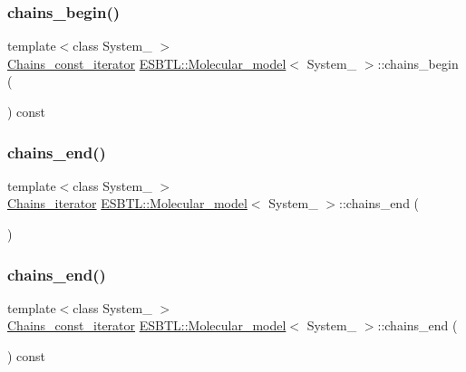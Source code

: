 \subsubsection{\texorpdfstring{chains\+\_\+begin()}{chains\_begin()}\hspace{0.1cm}{\footnotesize\ttfamily [2/2]}}
{\footnotesize\ttfamily template$<$class System\+\_\+ $>$ \\
\hyperlink{group__grp__iters_ga32c6b305275f21f3b184688be9d38ffd}{Chains\+\_\+const\+\_\+iterator} \hyperlink{classESBTL_1_1Molecular__model}{E\+S\+B\+T\+L\+::\+Molecular\+\_\+model}$<$ System\+\_\+ $>$\+::chains\+\_\+begin (\begin{DoxyParamCaption}{ }\end{DoxyParamCaption}) const\hspace{0.3cm}{\ttfamily [inline]}}

\mbox{\label{group__grp__iters_gac29bcba007d1b8b5d15de7e87ffe3e75}} 
\subsubsection{\texorpdfstring{chains\+\_\+end()}{chains\_end()}\hspace{0.1cm}{\footnotesize\ttfamily [1/2]}}
{\footnotesize\ttfamily template$<$class System\+\_\+ $>$ \\
\hyperlink{group__grp__iters_ga763cc293a5df9ae7dd6e31c198dce24b}{Chains\+\_\+iterator} \hyperlink{classESBTL_1_1Molecular__model}{E\+S\+B\+T\+L\+::\+Molecular\+\_\+model}$<$ System\+\_\+ $>$\+::chains\+\_\+end (\begin{DoxyParamCaption}{ }\end{DoxyParamCaption})\hspace{0.3cm}{\ttfamily [inline]}}

\mbox{\label{group__grp__iters_ga9ac120ccf9bf4752172e0013a5bca729}} 
\subsubsection{\texorpdfstring{chains\+\_\+end()}{chains\_end()}\hspace{0.1cm}{\footnotesize\ttfamily [2/2]}}
{\footnotesize\ttfamily template$<$class System\+\_\+ $>$ \\
\hyperlink{group__grp__iters_ga32c6b305275f21f3b184688be9d38ffd}{Chains\+\_\+const\+\_\+iterator} \hyperlink{classESBTL_1_1Molecular__model}{E\+S\+B\+T\+L\+::\+Molecular\+\_\+model}$<$ System\+\_\+ $>$\+::chains\+\_\+end (\begin{DoxyParamCaption}{ }\end{DoxyParamCaption}) const\hspace{0.3cm}{\ttfamily [inline]}}

